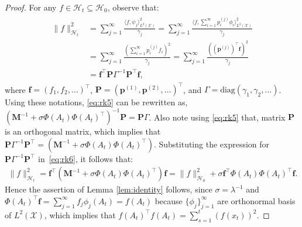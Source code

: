 \documentclass[10pt,a4paper]{amsart}
\begin{document}
\begin{proof}
For any $f\in \mathcal H_t \subseteq\mathcal H_0$, observe that:
\begin{align}\label{eq:rk6}
\begin{split}
    \|f\|_{\mathcal H_t}^2 &=\sum_{j=1}^{\infty}  \frac{\langle f,\psi_j\rangle_{L^2(\mathcal X)}^2}{\gamma_j} = \sum_{j=1}^{\infty}  \frac{\langle f,\sum_{i=1}^{\infty} p^{(j)}_i  \phi_i \rangle_{L^2(\mathcal X)}^2}{\gamma_j}\\
    &= \sum_{j=1}^{\infty}  \frac{(\sum_{i=1}^{\infty} p^{(j)}_i f_i )^2}{\gamma_j}  = \sum_{j=1}^{\infty}  \frac{((\mathbf{p}^{(j)})^\top \mathbf{f})^2}{\gamma_j}\\
    & =   \mathbf{f}^\top \mathbf{P}\Gamma^{-1}\mathbf{P}^\top\mathbf{f},
\end{split}
\end{align}
where $\mathbf{f}=(f_1,f_2,\ldots)^\top$, $\mathbf{P}= (\mathbf{p}^{(1)},\mathbf{p}^{(2)},\ldots)^\top$, and $\Gamma= \text{diag}(\gamma_1,\gamma_2,\ldots)$. Using these notations, \eqref{eq:rk5} can be rewritten as, $(\mathbf{M}^{-1} + \sigma \Phi(A_t)\Phi(A_t)^\top)^{-1} \mathbf{P}=  \mathbf{P}\Gamma$. Also note using \eqref{eq:rk5} that, matrix $\mathbf{P}$ is an orthogonal matrix, which implies that $\mathbf{P}\Gamma^{-1}\mathbf{P}^\top = (\mathbf{M}^{-1} + \sigma \Phi(A_t)\Phi(A_t)^\top) $. Substituting the expression for $\mathbf{P}\Gamma^{-1}\mathbf{P}^\top$ in~\eqref{eq:rk6}, it follows that:
\begin{align}
    \|f\|_{\mathcal H_t}^2 = \mathbf{f}^\top (\mathbf{M}^{-1} + \sigma \Phi(A_t)\Phi(A_t)^\top) \mathbf{f} = \|f\|_{\mathcal H_0}^2 + \sigma \mathbf{f}^\top \Phi(A_t)\Phi(A_t)^\top \mathbf{f}.
\end{align}
Hence the assertion of Lemma \ref{lem:identity} follows, since $\sigma=  \lambda^{-1}$ and $\Phi(A_t)^\top \mathbf{f} = \sum_{j=1}^{\infty} f_j \phi_j(A_t) = f(A_t)$ because $\{\phi_j\}_{j=1}^{\infty}$ are orthonormal basis of $L^2(\mathcal X)$, which implies that $f(A_t)^\top f(A_t)= \sum_{s=1}^{t}(f(x_t))^2$.
\end{proof}
\end{document}
